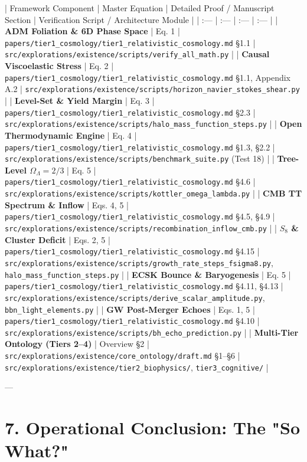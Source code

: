 \documentclass[11pt,a4paper]{article}
\theoremstyle{definition}
\theoremstyle{remark}
\begin{document}
| Framework Component | Master Equation | Detailed Proof / Manuscript Section | Verification Script / Architecture Module |
| :--- | :--- | :--- | :--- |
| \textbf{ADM Foliation \& 6D Phase Space} | Eq. 1 | \texttt{papers/tier1_cosmology/tier1_relativistic_cosmology.md} \S 1.1 | \texttt{src/explorations/existence/scripts/verify_all_math.py} |
| \textbf{Causal Viscoelastic Stress} | Eq. 2 | \texttt{papers/tier1_cosmology/tier1_relativistic_cosmology.md} \S 1.1, Appendix A.2 | \texttt{src/explorations/existence/scripts/horizon_navier_stokes_shear.py} |
| \textbf{Level-Set \& Yield Margin} | Eq. 3 | \texttt{papers/tier1_cosmology/tier1_relativistic_cosmology.md} \S 2.3 | \texttt{src/explorations/existence/scripts/halo_mass_function_steps.py} |
| \textbf{Open Thermodynamic Engine} | Eq. 4 | \texttt{papers/tier1_cosmology/tier1_relativistic_cosmology.md} \S 1.3, \S 2.2 | \texttt{src/explorations/existence/scripts/benchmark_suite.py} (Test 18) |
| \textbf{Tree-Level $\Omega_\Lambda = 2/3$} | Eq. 5 | \texttt{papers/tier1_cosmology/tier1_relativistic_cosmology.md} \S 4.6 | \texttt{src/explorations/existence/scripts/kottler_omega_lambda.py} |
| \textbf{CMB TT Spectrum \& Inflow} | Eqs. 4, 5 | \texttt{papers/tier1_cosmology/tier1_relativistic_cosmology.md} \S 4.5, \S 4.9 | \texttt{src/explorations/existence/scripts/recombination_inflow_cmb.py} |
| \textbf{$S_8$ \& Cluster Deficit} | Eqs. 2, 5 | \texttt{papers/tier1_cosmology/tier1_relativistic_cosmology.md} \S 4.15 | \texttt{src/explorations/existence/scripts/growth_rate_steps_fsigma8.py}, \texttt{halo_mass_function_steps.py} |
| \textbf{ECSK Bounce \& Baryogenesis} | Eq. 5 | \texttt{papers/tier1_cosmology/tier1_relativistic_cosmology.md} \S 4.11, \S 4.13 | \texttt{src/explorations/existence/scripts/derive_scalar_amplitude.py}, \texttt{bbn_light_elements.py} |
| \textbf{GW Post-Merger Echoes} | Eqs. 1, 5 | \texttt{papers/tier1_cosmology/tier1_relativistic_cosmology.md} \S 4.10 | \texttt{src/explorations/existence/scripts/bh_echo_prediction.py} |
| \textbf{Multi-Tier Ontology (Tiers 2–4)} | Overview \S 2 | \texttt{src/explorations/existence/core_ontology/draft.md} \S 1–\S 6 | \texttt{src/explorations/existence/tier2_biophysics/}, \texttt{tier3_cognitive/} |

---

\section{7. Operational Conclusion: The "So What?"}
\end{document}
